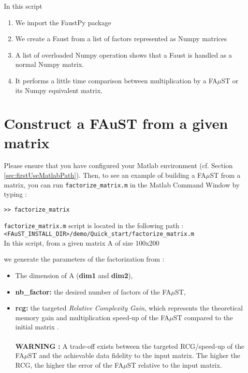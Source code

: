 	In this script
	\begin{enumerate}
		\item We import the FaustPy package
		
		\item We create a Faust from a list of factors represented as Numpy matrices
		
		\item A list of overloaded Numpy operation shows that a Faust is handled as a normal
			  Numpy matrix.
		
		\item It performs a little time comparison between multiplication by a FA$\mu$ST or its Numpy equivalent matrix.
			  
	\end{enumerate}
		
	
\section{Construct a FAuST from a given matrix}\label{sec:WorkingProgressBuildFromMatrix}
Please ensure that you have configured your Matlab environment (cf. Section \ref{sec:firstUseMatlabPath}). Then, to see an example of building a FA$\mu$ST from a matrix, you can run \texttt{factorize\_matrix.m} in the Matlab Command Window by typing :
\lstset{style=customMatlab}
\begin{lstlisting}
>> factorize_matrix
\end{lstlisting}
\texttt{factorize\_matrix.m} script is located in the following path :\\
\texttt{<FAuST\_INSTALL\_DIR>/demo/Quick\_start/factorize\_matrix.m} \\

In this script, from a given matrix A of size 100x200 

we generate the parameters of the factorization from :
\begin{itemize}
\item The dimension of A (\textbf{dim1} and \textbf{dim2}),
\item \textbf{nb\_factor:} the desired number of factors of the FA$\mu$ST,
\item \textbf{rcg:} the targeted {\em Relative Complexity Gain}, which represents the theoretical memory gain and multiplication speed-up of the FA$\mu$ST compared to the initial matrix .
\\ \\\textbf{WARNING :}  A trade-off exists between the targeted RCG/speed-up of the FA$\mu$ST and the achievable data fidelity to the input matrix. The higher the RCG, the higher the error of the FA$\mu$ST relative to the input matrix.
\end{itemize}

